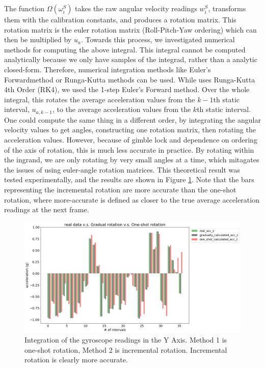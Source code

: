 \documentclass{article}
\begin{document}
    The function $\Omega(\omega^S_i)$ takes the raw angular velocity readings $w^S_i$, transforms them with the calibration constants, and produces a rotation matrix. This rotation matrix is the euler rotation matrix (Roll-Pitch-Yaw ordering) which can then be multiplied by $u_a$. Towards this process, we investigated numerical methods for computing the above integral. This integral cannot be computed analytically because we only have samples of the integrad, rather than a analytic closed-form. Therefore, numerical integration methods like Euler's Forwardmethod or Runga-Kutta methods can be used. While \cite{tedaldi_robust_2014} uses Runga-Kutta 4th Order (RK4), we used the 1-step Euler's Forward method. Over the whole integral, this rotates the average acceleration values from the $k-1$th static interval, $u_{a,k-1}$, to the average acceleration values from the $k$th static interval. One could compute the same thing in a different order, by integrating the angular velocity values to get angles, constructing one rotation matrix, then rotating the acceleration values. However, because of gimble lock and dependence on ordering of the axis of rotation, this is much less accurate in practice. By rotating within the ingrand, we are only rotating by very small angles at a time, which mitagates the issues of using euler-angle rotation matrices. This theoretical result was tested experimentally, and the results are shown in Figure \ref{fig:gyro_integration}. Note that the bars representing the incremental rotation are more accurate than the one-shot rotation, where more-accurate is defined as closer to the true average acceleration readings at the next frame.

    \begin{figure}[H]
      \centering
      \includegraphics[width=1\linewidth]{./images/gyro_integration_y.png}
      \caption{Integration of the gyroscope readings in the Y Axis. Method 1 is one-shot rotation, Method 2 is incremental rotation. Incremental rotation is clearly more accurate.}
      \label{fig:gyro_integration}
    \end{figure}
\end{document}
